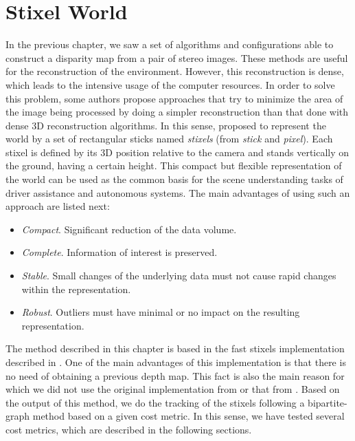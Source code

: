 
\graphicspath{{./images/chapter04/bmps/}{./images/chapter04/vects/}{./images/chapter04/}}

\chapter{Stixel World}\label{ch:chapter04}

In the previous chapter, we saw a set of algorithms and configurations able to construct a disparity map from a pair of stereo images. These methods are useful for the reconstruction of the environment. However, this reconstruction is dense, which leads to the intensive usage of the computer resources. In order to solve this problem, some authors propose approaches that try to minimize the area of the image being processed by doing a simpler reconstruction than that done with dense 3D reconstruction algorithms. In this sense, \cite{badino2009stixel} proposed to represent the world by a set of rectangular sticks named \emph{stixels} (from \emph{stick} and \emph{pixel}). Each stixel is defined by its 3D position relative to the camera and stands vertically on the ground, having a certain height.
This compact but flexible representation of the world can be used as the common basis for the scene understanding tasks of driver assistance and autonomous systems. The main advantages of using such an approach are listed next:
\begin{itemize}
 \item \emph{Compact}. Significant reduction of the data volume.
 \item \emph{Complete}. Information of interest is preserved.
 \item \emph{Stable}. Small changes of the underlying data must not cause rapid changes within the representation.
 \item \emph{Robust}. Outliers must have minimal or no impact on the resulting representation.
\end{itemize}

The method described in this chapter is based in the fast stixels implementation described in \cite{benenson2012pedestrian}. One of the main advantages of this implementation is that there is no need of obtaining a previous depth map. This fact is also the main reason for which we did not use the original implementation from \cite{badino2009stixel} or that from \cite{pfeiffer2010efficient}. Based on the output of this method, we do the tracking of the stixels following a bipartite-graph method based on a given cost metric. In this sense, we have tested several cost metrics, which are described in the following sections.


